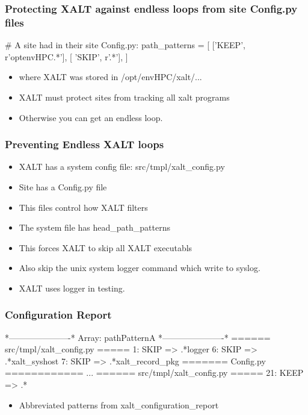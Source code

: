 \documentclass{beamer}
\begin{document}
\begin{frame}[fragile]
    \frametitle{Protecting XALT against endless loops from site
      Config.py files}
 {\tiny
    \begin{semiverbatim}
# A site had in their site Config.py: 
path_patterns = [
  ['KEEP',  r'\/opt\/envHPC\/.*'],
  [ 'SKIP',  r'.*'],
  ]
    \end{semiverbatim}
}
  \begin{itemize}
    \item where XALT was stored in /opt/envHPC/xalt/...
    \item XALT must protect sites from tracking all xalt programs
    \item Otherwise you can get an endless loop.
  \end{itemize}
\end{frame}

\begin{frame}[fragile]
    \frametitle{Preventing Endless XALT loops}
  \begin{itemize}
    \item XALT has a system config file: src/tmpl/xalt\_config.py
    \item Site has a Config.py file
    \item This files control how XALT filters
    \item The system file has head\_path\_patterns
    \item This forces XALT to skip all XALT executabls
    \item Also skip the unix system logger command which write to
      syslog.
    \item XALT uses logger in testing.
  \end{itemize}
\end{frame}

\begin{frame}[fragile]
    \frametitle{Configuration Report}
 {\tiny
    \begin{semiverbatim}
*----------------------*
 Array: pathPatternA
*----------------------*
====== src/tmpl/xalt\_config.py =====
   1: SKIP => .*\/logger
   6: SKIP => .*\/xalt\_syshost
   7: SKIP => .*\/xalt\_record\_pkg
======= Config.py ============
...
====== src/tmpl/xalt\_config.py =====
  21: KEEP => .*

    \end{semiverbatim}
}
  \begin{itemize}
    \item Abbreviated patterns from xalt\_configuration\_report
  \end{itemize}
\end{frame}
\end{document}

